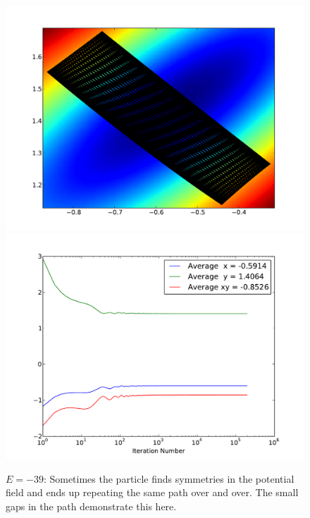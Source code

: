 \documentclass[letterpaper]{article}
\begin{document}
\begin{figure}[p]
\begin{center}
\includegraphics[width=5in]{t8.pdf}
\includegraphics[width=5in]{t8a.pdf}
\end{center}
\caption{$E=-39$: Sometimes the particle finds symmetries in the potential field
and ends up repeating the same path over and over. The small gaps in the path
demonstrate this here.}
\label{fig:t8}
\end{figure}
\end{document}
